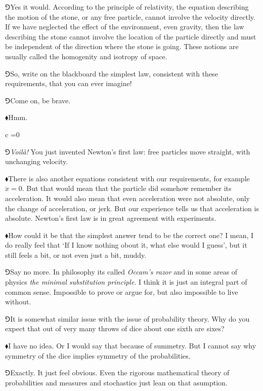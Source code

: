 \documentclass[10pt,oneside%
]{memoir}
\newenvironment{eqna}{\begin{IEEEeqnarray*}{c}}{\end{IEEEeqnarray*}\ignorespacesafterend}
\newcommand{\hea}{\(\blacklozenge\)\;}
\newcommand{\heb}{\(\Game\)\;}
\begin{document}
\heb Yes it would. According to the principle of relativity, the equation describing the motion of the stone, or any free particle, cannot involve the velocity directly. If we have neglected the effect of the environment, even gravity, then the law describing the stone cannot involve the location of the particle directly and must be independent of the direction where the stone is going. These notions are usually called the homogenity and isotropy of space.

\heb So, write on the blackboard the simplest law, consistent with these requirements, that you can ever imagine!

\heb Come on, be brave.

\hea Hmm.
\begin{eqna}
    =0
\end{eqna}

\heb \emph{Voil\`a!} You just invented Newton's first law: free particles move straight, with unchanging velocity.

\hea There is also another equations consistent with our requirements, for example \(\dddot{x}=0\). But that would mean that the particle did somehow remember its acceleration. It would also mean that even acceleration were not absolute, only the change of acceleration, or jerk. But our experience tells us that acceleration is absolute. Newton's first law is in great agreement with experiments.

\hea How could it be that the simplest answer tend to be the correct one? I mean, I do really feel that `If I know nothing obout it, what else would I guess', but it still feels a bit, or not even just a bit, muddy.

\heb Say no more. In philosophy its called \emph{Occam's razor} and in some areas of physics \emph{the minimal substitution principle}. I think it is just an integral part of common sense. Impossible to prove or argue for, but also impossible to live without.

\heb It is somewhat similar issue with the issue of probability theory. Why do you expect that out of very many throws of dice about one sixth are sixes?

\hea I have no idea. Or I would say that because of summetry. But I cannot say why symmetry of the dice implies symmetry of the probabilities.

\heb Exactly. It just feel obvious. Even the rigorous mathematical theory of probabilities and measures and stochastics just lean on that asumption.
\end{document}
